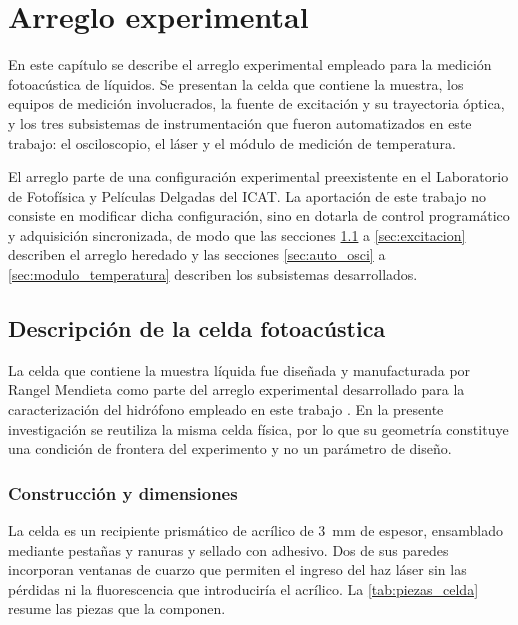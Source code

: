 \chapter{Arreglo experimental}
\label{cap:arreglo}

En este capítulo se describe el arreglo experimental empleado para la
medición fotoacústica de líquidos. Se presentan la celda que contiene
la muestra, los equipos de medición involucrados, la fuente de
excitación y su trayectoria óptica, y los tres subsistemas de
instrumentación que fueron automatizados en este trabajo: el
osciloscopio, el láser y el módulo de medición de temperatura.

El arreglo parte de una configuración experimental preexistente en el
Laboratorio de Fotofísica y Películas Delgadas del ICAT. La aportación
de este trabajo no consiste en modificar dicha configuración, sino en
dotarla de control programático y adquisición sincronizada, de modo
que las secciones \ref{sec:celda} a \ref{sec:excitacion} describen el
arreglo heredado y las secciones \ref{sec:auto_osci} a
\ref{sec:modulo_temperatura} describen los subsistemas desarrollados.

\section{Descripción de la celda fotoacústica}
\label{sec:celda}

La celda que contiene la muestra líquida fue diseñada y manufacturada
por Rangel Mendieta como parte del arreglo experimental desarrollado
para la caracterización del hidrófono empleado en este trabajo
\cite{Rangel2023}. En la presente investigación se reutiliza la misma
celda física, por lo que su geometría constituye una condición de
frontera del experimento y no un parámetro de diseño.

\subsection*{Construcción y dimensiones}

La celda es un recipiente prismático de acrílico de \SI{3}{\milli\meter}
de espesor, ensamblado mediante pestañas y ranuras y sellado con
adhesivo. Dos de sus paredes incorporan ventanas de cuarzo que
permiten el ingreso del haz láser sin las pérdidas ni la fluorescencia
que introduciría el acrílico. La \cref{tab:piezas_celda} resume las
piezas que la componen.

